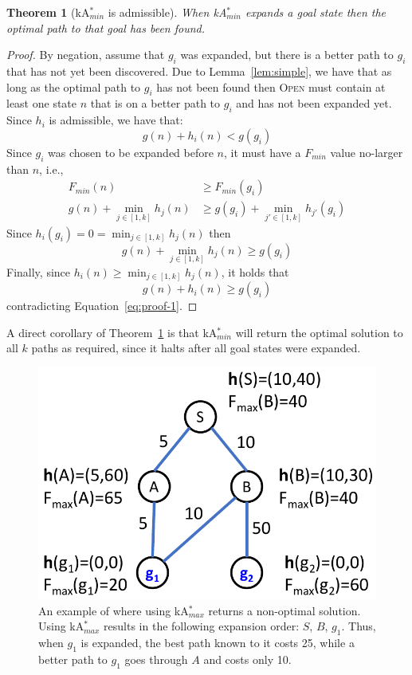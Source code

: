 \documentclass{aicom2e}
\newtheorem{theorem}{Theorem}
\newcommand{\kastarmin}{kA$^*_{min}$}
\newcommand{\kastarmax}{kA$^*_{max}$}
\newcommand{\open}{\textsc{Open}}
\begin{document}
 
\begin{theorem}[\kastarmin{} is admissible]
When \kastarmin{} expands a goal state then the optimal path to that goal has been found.
	\label{the:min-f}
\end{theorem}
 \begin{proof}
	By negation, assume that $g_i$ was expanded, but there is
	a better path to $g_i$ that has not yet been discovered. Due to Lemma~\ref{lem:simple}, we have that as long as the optimal path to $g_i$ has not been found then 
	\open{} must contain at least one state $n$
	that is on a better path to $g_i$ and has not been expanded yet. Since $h_i$ is admissible, we have that: 
	\begin{equation}
	g(n)+h_i(n)<g(g_i)
	\label{eq:proof-1}
	\end{equation}
	Since $g_i$ was chosen to be expanded before $n$, it must have a $F_{min}$ value no-larger than $n$, i.e.,
	\begin{align}
	F_{min}(n) &\geq  F_{min}(g_i) \\
	g(n)+\min_{j\in [1,k]}h_j(n)& \geq  g(g_i)+\min_{j'\in [1,k]}h_{j'}(g_i)
	\end{align}
	Since $h_i(g_i)=0=\min_{j\in [1,k]}h_j(n)$ then
	\[ g(n)+\min_{j\in [1,k]}h_j(n) \geq  g(g_i) \]
	Finally, since $h_i(n)\geq \min_{j\in [1,k]} h_j(n)$, it holds that
	\[ g(n)+h_i(n) \geq  g(g_i) \]
	contradicting Equation~\ref{eq:proof-1}.
\end{proof}

A direct corollary of Theorem~\ref{the:min-f} is that \kastarmin{} will return the optimal solution to all $k$ paths as required, since it halts after all goal states were expanded. 




\begin{figure}
 \includegraphics[width=0.85\columnwidth]{max-bad_cropped.pdf}
 \caption{An example of where using \kastarmax{} returns a non-optimal solution. Using \kastarmax{} results in the following expansion order: $S$, $B$, $g_1$.
 Thus, when $g_1$ is expanded, the best path known to it costs 25, while a
 better path to $g_1$ goes through $A$ and costs only 10.}
 \label{fig:max-bad}
 \end{figure}
\end{document}
